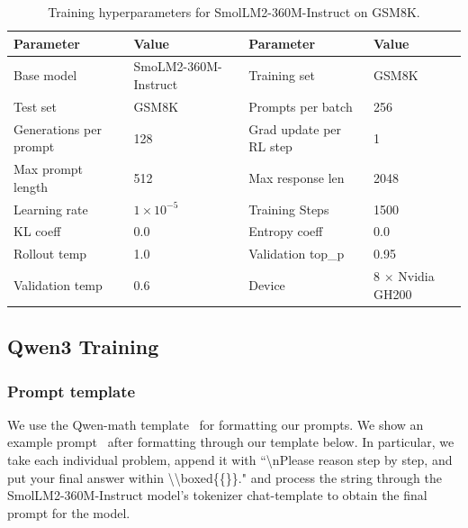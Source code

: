 \documentclass[10pt]{article} %
\begin{document}
\begin{table}[h!]
  \caption{Training hyperparameters for SmolLM2-360M-Instruct on GSM8K.}
  \label{tab:config_smollm}
  \centering
  \begin{tcolorbox}[
    enhanced,
    hbox,
    title={\hspace{0.0cm} Training hyperparameters for SmolLM2-360M-Instruct},
    colback=teal!5,
    colframe=teal,      
    coltext=black,
    coltitle=white,
    fonttitle=\bfseries,
    arc=1mm,
    boxrule=1pt,
    boxsep=1pt,                
    left=2pt, right=2pt,       
    top=0pt,                   
    bottom=2pt,       
    toptitle=3pt, bottomtitle=3pt,
    center
  ]
    \small
    \renewcommand{\arraystretch}{1.2}
    \setlength{\tabcolsep}{12pt}
\begin{tabular}{l|l|l|l} 
  \textbf{Parameter} & \textbf{Value} & \textbf{Parameter} & \textbf{Value} \\
  \hline
  Base model & SmoLM2-360M-Instruct & Training set & GSM8K \\
  Test set & GSM8K & Prompts per batch & 256 \\
  Generations per prompt & 128 & Grad update per RL step & 1 \\
  Max prompt length & 512 & Max response len & 2048 \\
  Learning rate & $1 \times 10^{-5}$ &  Training Steps & 1500 \\
  KL coeff & 0.0 & Entropy coeff & 0.0 \\
  Rollout temp & 1.0 & Validation top\_p & 0.95 \\
  Validation temp & 0.6 & Device & 8 $\times$ Nvidia GH200 \\
\end{tabular}
  \end{tcolorbox}
\end{table}

\newpage

\subsection{Qwen3 Training} \label{app:realistic_reasoning_task_description}

\subsubsection{Prompt template}

We use the Qwen-math template~\citep{yang2024qwen2technicalreport,qwen2025qwen25technicalreport,yang2024qwen25mathtechnicalreportmathematical} for formatting our prompts. We show an example prompt~\citep{yu2025dapoopensourcellmreinforcement} after formatting through our template below. In particular, we take each individual problem, append it with ``\textbackslash nPlease reason step by step, and put your final answer within \textbackslash \textbackslash boxed\{\{\}\}." and process the string through the SmolLM2-360M-Instruct model's tokenizer chat-template to obtain the final prompt for the model.
\end{document}
